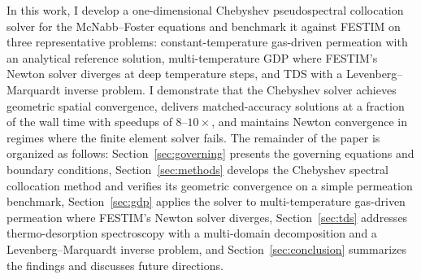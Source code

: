 In this work, I develop a one-dimensional Chebyshev pseudospectral collocation solver for the McNabb--Foster equations and benchmark it against FESTIM on three representative problems: constant-temperature gas-driven permeation with an analytical reference solution, multi-temperature GDP where FESTIM's Newton solver diverges at deep temperature steps, and TDS with a Levenberg--Marquardt inverse problem. I demonstrate that the Chebyshev solver achieves geometric spatial convergence, delivers matched-accuracy solutions at a fraction of the wall time with speedups of $8$--$10\times$, and maintains Newton convergence in regimes where the finite element solver fails. The remainder of the paper is organized as follows: Section~\ref{sec:governing} presents the governing equations and boundary conditions, Section~\ref{sec:methods} develops the Chebyshev spectral collocation method and verifies its geometric convergence on a simple permeation benchmark, Section~\ref{sec:gdp} applies the solver to multi-temperature gas-driven permeation where FESTIM's Newton solver diverges, Section~\ref{sec:tds} addresses thermo-desorption spectroscopy with a multi-domain decomposition and a Levenberg--Marquardt inverse problem, and Section~\ref{sec:conclusion} summarizes the findings and discusses future directions.
